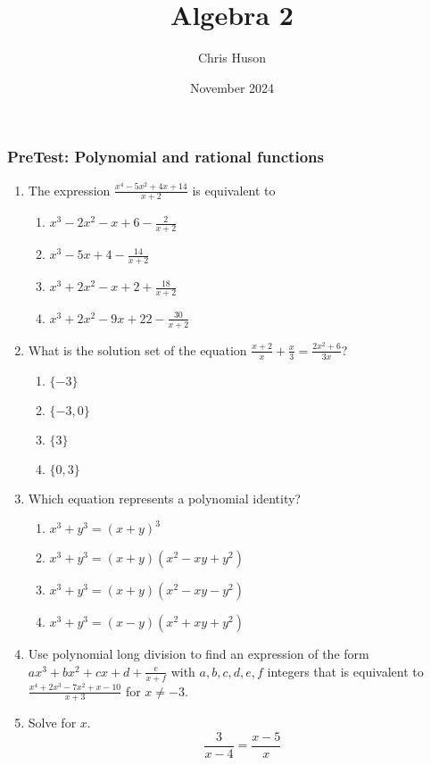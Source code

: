 \documentclass[12pt, twoside]{article}
\title{Algebra 2}
\author{Chris Huson}
\date{November 2024}
\begin{document}
\subsubsection*{PreTest: Polynomial and rational functions}
\begin{enumerate}[itemsep=0.5cm]

\item The expression $\displaystyle \frac{x^4 - 5x^2 + 4x + 14}{x+2}$ is equivalent to
\begin{enumerate}
    \item $\displaystyle x^3 - 2x^2 - x + 6 - \frac{2}{x + 2}$
    \item $\displaystyle x^3 - 5x + 4 - \frac{14}{x + 2}$
    \item $\displaystyle x^3 + 2x^2 - x + 2 + \frac{18}{x + 2}$
    \item $\displaystyle x^3 + 2x^2 - 9x + 22 - \frac{30}{x + 2}$
\end{enumerate}

\item What is the solution set of the equation \(\displaystyle \frac{x+2}{x} + \frac{x}{3} = \frac{2x^2+6}{3x}\)?
\begin{enumerate}
    \item \(\{-3\}\)
    \item \(\{-3, 0\}\)
    \item \(\{3\}\)
    \item \(\{0, 3\}\)
\end{enumerate}

\item Which equation represents a polynomial identity? %
\begin{enumerate}
    \item \(x^3 + y^3 = (x + y)^3\)
    \item \(x^3 + y^3 = (x + y)(x^2 - xy + y^2)\)
    \item \(x^3 + y^3 = (x + y)(x^2 - xy - y^2)\)
    \item \(x^3 + y^3 = (x - y)(x^2 + xy + y^2)\)
\end{enumerate}

\newpage
\item Use polynomial long division to find an expression of the form $ax^3 + bx^2 +cx +d +\frac{e}{x+f}$ with $a,b,c,d, e, f$ integers that is equivalent to $\displaystyle \frac{x^4 + 2x^3 - 7x^2 + x - 10}{x + 3}
$ for $x \neq -3$.
\vspace{10cm}

\item Solve for $x$.
$$\frac{3}{x-4} = \frac{x-5}{x}$$ \vspace{4cm}


\end{enumerate}
\end{document}
